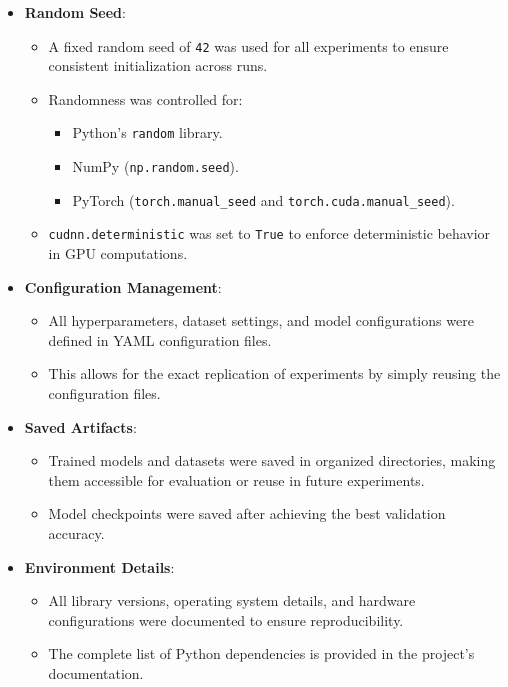 \begin{itemize}
    \item \textbf{Random Seed}: 
    \begin{itemize}
        \item A fixed random seed of \texttt{42} was used for all experiments to ensure consistent initialization across runs.
        \item Randomness was controlled for:
        \begin{itemize}
            \item Python's \texttt{random} library.
            \item NumPy (\texttt{np.random.seed}).
            \item PyTorch (\texttt{torch.manual\_seed} and \texttt{torch.cuda.manual\_seed}).
        \end{itemize}
        \item \texttt{cudnn.deterministic} was set to \texttt{True} to enforce deterministic behavior in GPU computations.
    \end{itemize}
    \item \textbf{Configuration Management}:
    \begin{itemize}
        \item All hyperparameters, dataset settings, and model configurations were defined in YAML configuration files.
        \item This allows for the exact replication of experiments by simply reusing the configuration files.
    \end{itemize}
    \item \textbf{Saved Artifacts}:
    \begin{itemize}
        \item Trained models and datasets were saved in organized directories, making them accessible for evaluation or reuse in future experiments.
        \item Model checkpoints were saved after achieving the best validation accuracy.
    \end{itemize}
    \item \textbf{Environment Details}:
    \begin{itemize}
        \item All library versions, operating system details, and hardware configurations were documented to ensure reproducibility.
        \item The complete list of Python dependencies is provided in the project’s documentation.
    \end{itemize}
\end{itemize}

